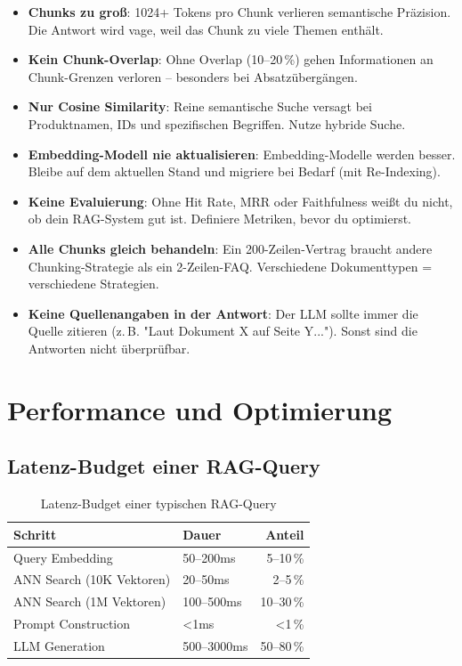 \begin{itemize}[leftmargin=*]
    \item \textbf{Chunks zu groß}: 1024+ Tokens pro Chunk verlieren semantische Präzision. Die Antwort wird vage, weil das Chunk zu viele Themen enthält.
    \item \textbf{Kein Chunk-Overlap}: Ohne Overlap (10--20\,\%) gehen Informationen an Chunk-Grenzen verloren -- besonders bei Absatzübergängen.
    \item \textbf{Nur Cosine Similarity}: Reine semantische Suche versagt bei Produktnamen, IDs und spezifischen Begriffen. Nutze hybride Suche.
    \item \textbf{Embedding-Modell nie aktualisieren}: Embedding-Modelle werden besser. Bleibe auf dem aktuellen Stand und migriere bei Bedarf (mit Re-Indexing).
    \item \textbf{Keine Evaluierung}: Ohne Hit Rate, MRR oder Faithfulness weißt du nicht, ob dein RAG-System gut ist. Definiere Metriken, bevor du optimierst.
    \item \textbf{Alle Chunks gleich behandeln}: Ein 200-Zeilen-Vertrag braucht andere Chunking-Strategie als ein 2-Zeilen-FAQ. Verschiedene Dokumenttypen = verschiedene Strategien.
    \item \textbf{Keine Quellenangaben in der Antwort}: Der LLM sollte immer die Quelle zitieren (z.\,B. "Laut Dokument X auf Seite Y..."). Sonst sind die Antworten nicht überprüfbar.
\end{itemize}

\section{Performance und Optimierung}

\subsection{Latenz-Budget einer RAG-Query}

\begin{table}[H]
\centering
\begin{tabularx}{\linewidth}{lXr}
\toprule
\textbf{Schritt} & \textbf{Dauer} & \textbf{Anteil} \\
\midrule
Query Embedding & 50--200ms & 5--10\,\% \\
ANN Search (10K Vektoren) & 20--50ms & 2--5\,\% \\
ANN Search (1M Vektoren) & 100--500ms & 10--30\,\% \\
Prompt Construction & <1ms & <1\,\% \\
LLM Generation & 500--3000ms & 50--80\,\% \\
\midrule
\end{tabularx}
\caption{Latenz-Budget einer typischen RAG-Query}
\label{tab:rag-latency}
\end{table}

